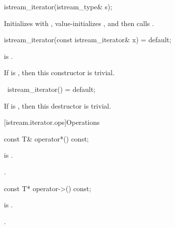 %
\begin{itemdecl}
istream_iterator(istream_type& s);
\end{itemdecl}

\begin{itemdescr}
\pnum
\effects
Initializes  with ,
value-initializes ,
and then calls .
\end{itemdescr}


%
\begin{itemdecl}
istream_iterator(const istream_iterator& x) = default;
\end{itemdecl}

\begin{itemdescr}
\pnum
\ensures
{} is .

\pnum
\remarks
If  is ,
then this constructor is trivial.
\end{itemdescr}

%
\begin{itemdecl}
~istream_iterator() = default;
\end{itemdecl}

\begin{itemdescr}
\pnum
\remarks
If  is ,
then this destructor is trivial.
\end{itemdescr}

[istream.iterator.ops]{Operations}

%
\begin{itemdecl}
const T& operator*() const;
\end{itemdecl}

\begin{itemdescr}
\pnum
\expects
{} is .

\pnum
\returns
{}.
\end{itemdescr}

%
\begin{itemdecl}
const T* operator->() const;
\end{itemdecl}

\begin{itemdescr}
\pnum
\expects
{} is .

\pnum
\returns
{}.
\end{itemdescr}

